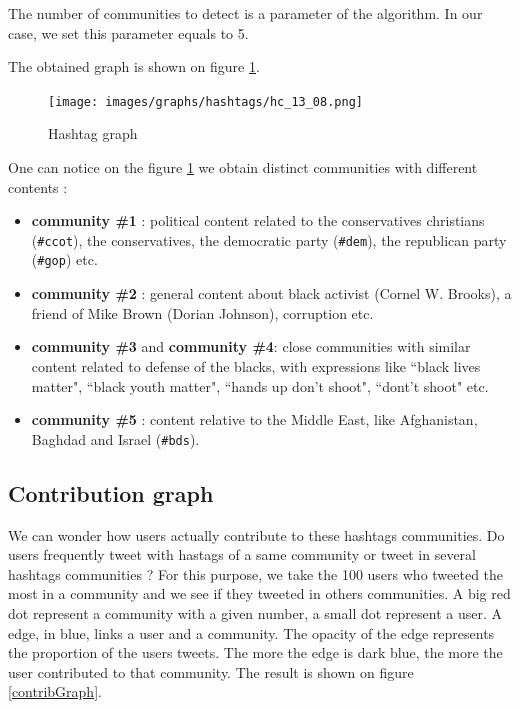 \documentclass[a4paper,twoside,12pt,openright]{report}
\begin{document}
The number of communities to detect is a parameter of the algorithm. In our case, we set this parameter equals to 5.

The obtained graph is shown on figure \ref{graphHt13c}.

\vfill

\begin{figure}[H]
\centering
\texttt{[image: images/graphs/hashtags/hc\_13\_08.png]}
\caption{Hashtag graph}
\label{graphHt13c}
\end{figure}

One can notice on the figure \ref{graphHt13c} we obtain distinct communities with different contents :


\begin{itemize}
\item \textbf{\textcolor{c_purple}{community \#1}} : political content related to the conservatives christians (\texttt{\#ccot}), the conservatives, the democratic party (\texttt{\#dem}), the republican party (\texttt{\#gop}) etc.
\item \textbf{\textcolor{c_red}{community \#2}} : general content about black activist (Cornel W. Brooks), a friend of Mike Brown (Dorian Johnson), corruption etc.
\item \textbf{\textcolor{c_green}{community \#3}} and \textbf{\textcolor{c_blue}{community \#4}}: close communities with similar content related to defense of the blacks, with expressions like ``black lives matter", ``black youth matter", ``hands up don't shoot", ``dont't shoot" etc.
\item \textbf{\textcolor{c_orange}{community \#5}} : content relative to the Middle East, like Afghanistan, Baghdad and Israel (\texttt{\#bds}).
\end{itemize}

\newpage
\subsection{Contribution graph}

We can wonder how users actually contribute to these hashtags communities. Do users frequently tweet with hastags of a same community or tweet in several hashtags communities ? For this purpose, we take the 100 users who tweeted the most in a community and we see if they tweeted in others communities. A big red dot represent a community with a given number, a small dot represent a user. A edge, in blue, links a user and a community. The opacity of the edge represents the proportion of the users tweets. The more the edge is dark blue, the more the user contributed to that community. The result is shown on figure \ref{contribGraph}.
\end{document}
